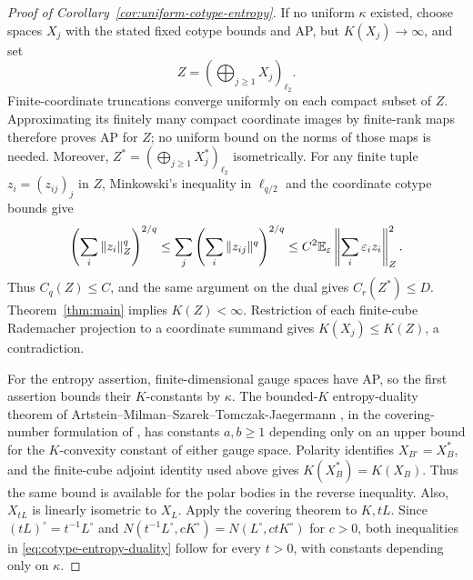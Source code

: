 \begin{proof}[Proof of Corollary~\ref{cor:uniform-cotype-entropy}]
If no uniform \(\kappa\) existed, choose spaces \(X_j\) with the
stated fixed cotype bounds and AP, but \(K(X_j)\to\infty\), and set
\[
Z=\left(\bigoplus_{j\ge1}X_j\right)_{\ell_2}.
\]
Finite-coordinate truncations converge uniformly on each compact subset
of \(Z\). Approximating its finitely many compact coordinate images by
finite-rank maps therefore proves AP for \(Z\); no uniform bound on
the norms of those maps is needed. Moreover,
\(Z^*=(\bigoplus_{j\ge1}X_j^*)_{\ell_2}\) isometrically.
For any finite tuple \(z_i=(z_{ij})_j\) in \(Z\), Minkowski's inequality
in \(\ell_{q/2}\) and the coordinate cotype bounds give
\[
\left(\sum_i\|z_i\|_Z^q\right)^{2/q}
\le \sum_j\left(\sum_i\|z_{ij}\|^q\right)^{2/q}
\le C^2\mathbb E_\varepsilon\left\|\sum_i\varepsilon_i z_i\right\|_Z^2.
\]
Thus \(C_q(Z)\le C\), and the same argument on the dual gives
\(C_r(Z^*)\le D\). Theorem~\ref{thm:main} implies \(K(Z)<\infty\).
Restriction of each finite-cube Rademacher projection to a coordinate
summand gives \(K(X_j)\le K(Z)\), a contradiction.

For the entropy assertion, finite-dimensional gauge spaces have AP,
so the first assertion bounds their \(K\)-constants by \(\kappa\).
The bounded-\(K\) entropy-duality theorem of
Artstein--Milman--Szarek--Tomczak-Jaegermann \cite[Theorem~5]{AMSTJ2004},
in the covering-number formulation of
\cite[Theorem~1.1, equation~(1.6), and Section~2]{Milman2007},
has constants \(a,b\ge1\) depending only on an upper bound for
the \(K\)-convexity constant of either gauge space.
Polarity identifies \(X_{B^\circ}=X_B^*\), and the finite-cube
adjoint identity used above gives \(K(X_B^*)=K(X_B)\).
Thus the same bound is available for the polar bodies in the reverse
inequality. Also, \(X_{tL}\) is linearly isometric to \(X_L\).
Apply the covering theorem to \(K,tL\). Since
\((tL)^\circ=t^{-1}L^\circ\) and
\(N(t^{-1}L^\circ,cK^\circ)=N(L^\circ,ctK^\circ)\) for \(c>0\),
both inequalities in \eqref{eq:cotype-entropy-duality} follow for every
\(t>0\), with constants depending only on \(\kappa\).
\end{proof}
